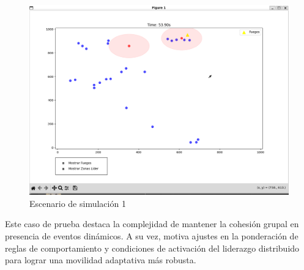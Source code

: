 \documentclass{article}
\begin{document}
\begin{figure}[H]
    \centering
    \includegraphics[width=1\linewidth]{escenario1.png}
    \caption{Escenario de simulación 1}
    \label{fig:enter-label}
\end{figure}

\noindent Este caso de prueba destaca la complejidad de mantener la cohesión grupal en presencia de eventos dinámicos. A su vez, motiva ajustes en la ponderación de reglas de comportamiento y condiciones de activación del liderazgo distribuido para lograr una movilidad adaptativa más robusta.
\end{document}
